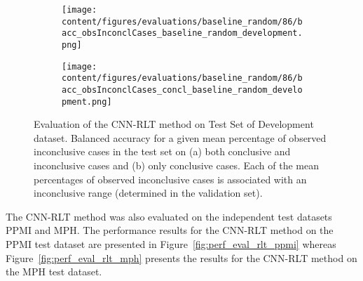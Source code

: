 \begin{figure}[ht]
  \begin{subfigure}{0.9\textwidth}
    \centering
    \texttt{[image: content/figures/evaluations/baseline\_random/86/bacc\_obsInconclCases\_baseline\_random\_development.png]}
    \subcaption{}
    \label{fig:bacc_obsInconclCases_baseline_random_development}
  \end{subfigure}
  \hfill
  \begin{subfigure}{0.9\textwidth}
    \centering
    \texttt{[image: content/figures/evaluations/baseline\_random/86/bacc\_obsInconclCases\_concl\_baseline\_random\_development.png]}
    \subcaption{}
    \label{fig:bacc_obsInconclCases_concl_baseline_random_development}
  \end{subfigure}

  \caption{Evaluation of the CNN-RLT method on Test Set of Development dataset.
  Balanced accuracy for a given mean percentage of observed inconclusive cases in the test set on 
  (a) both conclusive and inconclusive cases and (b) only conclusive cases. 
  Each of the mean percentages of observed inconclusive cases is associated with an inconclusive range (determined in the validation set). }
  \label{fig:bacc_obsInconclCases_baseline_random_development_full}
\end{figure}



The CNN-RLT method was also evaluated on the independent test datasets PPMI and MPH.
The performance results for the CNN-RLT method on the PPMI test dataset are presented in Figure~\ref{fig:perf_eval_rlt_ppmi} 
whereas Figure~\ref{fig:perf_eval_rlt_mph} presents the results for the CNN-RLT method on the MPH test dataset.



